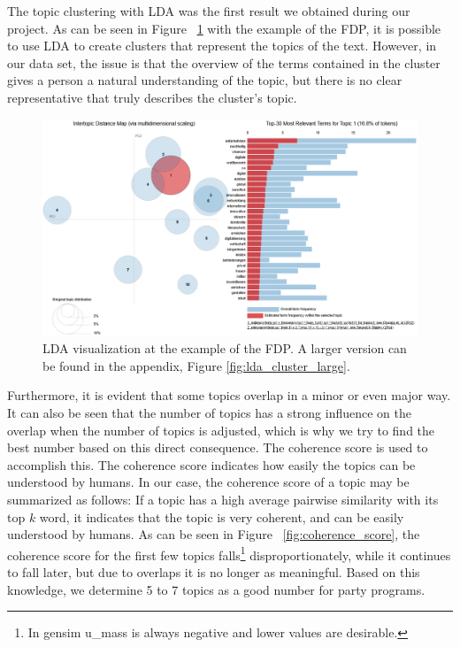 The topic clustering with LDA was the first result we obtained during our project.
As can be seen in Figure ~\ref{fig:lda_cluster} with the example of the FDP, it is possible to use LDA to create clusters that represent the topics of the text. 
However, in our data set, the issue is that the overview of the terms contained in the cluster gives a person a natural understanding of the topic, but there is no clear representative that truly describes the cluster's topic.

\begin{figure}[h]
    \centering
    \includegraphics [width=\linewidth]{resources/fdp_cluster.png}
    \caption{LDA visualization at the example of the FDP. A larger version can be found in the appendix, Figure \ref{fig:lda_cluster_large}.}
    \label{fig:lda_cluster}
\end{figure}

Furthermore, it is evident that some topics overlap in a minor or even major way. It can also be seen that the number of topics has a strong influence on the overlap when the number of topics is adjusted, which is why we try to find the best number based on this direct consequence. The coherence score is used to accomplish this. The coherence score indicates how easily the topics can be understood by humans. In our case, the coherence score of a topic may be summarized as follows: If a topic has a high average pairwise similarity with its top $k$ word, it indicates that the topic is very coherent, and can be easily understood by humans. \cite{mimno2011optimizing}
As can be seen in Figure ~\ref{fig:coherence_score}, the coherence score for the first few topics falls\footnote{In gensim u\_mass is always negative and lower values are desirable.} disproportionately, while it continues to fall later, but due to overlaps it is no longer as meaningful. Based on this knowledge, we determine 5 to 7 topics as a good number for party programs. 

